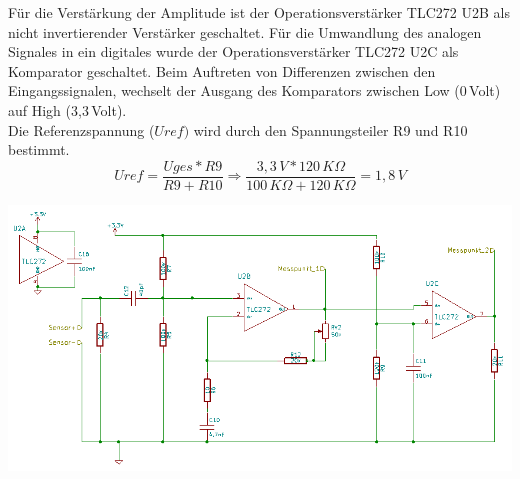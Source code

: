 Für die Verstärkung der Amplitude ist der Operationsverstärker TLC272 U2B als nicht invertierender Verstärker geschaltet.
Für die Umwandlung des analogen Signales in ein digitales wurde der Operationsverstärker TLC272 U2C als Komparator geschaltet. Beim Auftreten von Differenzen zwischen den Eingangssignalen, wechselt der Ausgang des Komparators zwischen Low (0\,Volt) auf High (3,3\,Volt).\\ Die Referenzspannung (\(\displaystyle Uref)\)  wird durch den Spannungsteiler R9 und R10 bestimmt.
\onehalfspacing \\
\[\displaystyle Uref=\frac{Uges*R9}{R9+R10}\Rightarrow\frac{3,3\,V*120\,K\Omega}{100\,K\Omega+120\,K\Omega}=1,8\,V \]
\singlespacing
\begin{center}
\begin{minipage}{1\textwidth}
\includegraphics[width=1\textwidth%
]{Abbildungen/Empfaenger.png}
\label{fig:Empfaengerschaltung}
\end{minipage}\\
\end{center}

